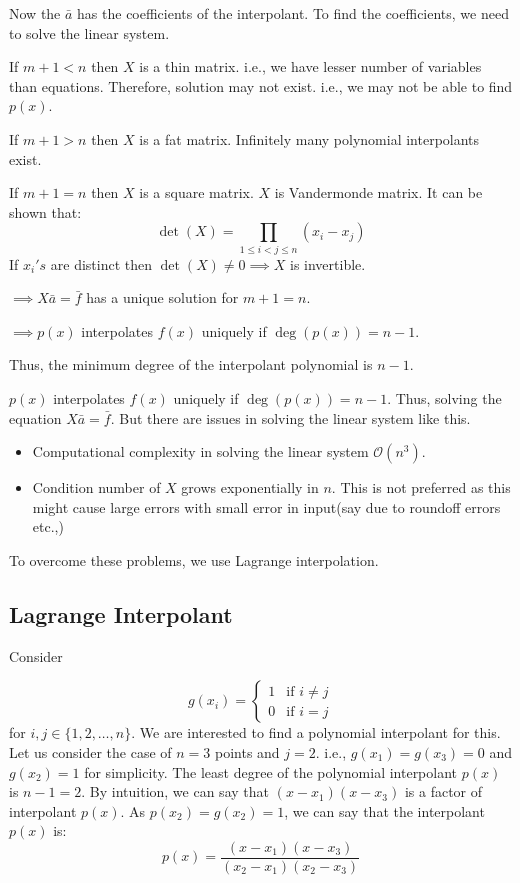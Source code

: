 \documentclass[
]{book}
\providecommand{\tightlist}{%
  \setlength{\itemsep}{0pt}\setlength{\parskip}{0pt}}
\begin{document}
Now the \(\bar{a}\) has the coefficients of the interpolant. To find the coefficients, we need to solve the linear system.

If \(m+1<n\) then \(X\) is a thin matrix. i.e., we have lesser number of variables than equations. Therefore, solution may not exist. i.e., we may not be able to find \(p(x)\).

If \(m+1>n\) then \(X\) is a fat matrix. Infinitely many polynomial interpolants exist.

If \(m+1=n\) then \(X\) is a square matrix. \(X\) is Vandermonde matrix. It can be shown that:
\[\det(X) = \prod_{1\le i<j\le n}(x_i-x_j)\]
If \(x_i's\) are distinct then \(\det(X)\neq 0 \implies X\) is invertible.

\(\implies X\bar{a} = \bar{f}\) has a unique solution for \(m+1=n\).

\(\implies p(x)\) interpolates \(f(x)\) uniquely if \(\deg(p(x)) = n-1\).

Thus, the minimum degree of the interpolant polynomial is \(n-1\).

\(p(x)\) interpolates \(f(x)\) uniquely if \(\deg(p(x))=n-1\). Thus, solving the equation \(X\bar{a} = \bar{f}\).
But there are issues in solving the linear system like this.

\begin{itemize}
\tightlist
\item
  Computational complexity in solving the linear system \(\mathcal{O}(n^3)\).
\item
  Condition number of \(X\) grows exponentially in \(n\). This is not preferred as this might cause large errors with small error in input(say due to roundoff errors etc.,)
\end{itemize}

To overcome these problems, we use Lagrange interpolation.

\hypertarget{lagrange-interpolant}{%
\subsection{Lagrange Interpolant}\label{lagrange-interpolant}}

Consider

\begin{equation}
g(x_i) = \begin{cases}
        1 & \text{if } i\neq j\\
        0 & \text{if } i=j
    \end{cases}
\end{equation}
for \(i,j \in \{1,2,\dots,n\}\). We are interested to find a polynomial interpolant for this. Let us consider the case of \(n=3\) points and \(j=2\). i.e., \(g(x_1)=g(x_3)=0\) and \(g(x_2)=1\) for simplicity. The least degree of the polynomial interpolant \(p(x)\) is \(n-1=2\). By intuition, we can say that \((x-x_1)(x-x_3)\) is a factor of interpolant \(p(x)\). As \(p(x_2)=g(x_2)=1\), we can say that the interpolant \(p(x)\) is:
\begin{equation}
p(x) = \frac{(x-x_1)(x-x_3)}{(x_2-x_1)(x_2-x_3)}
\end{equation}
\end{document}
